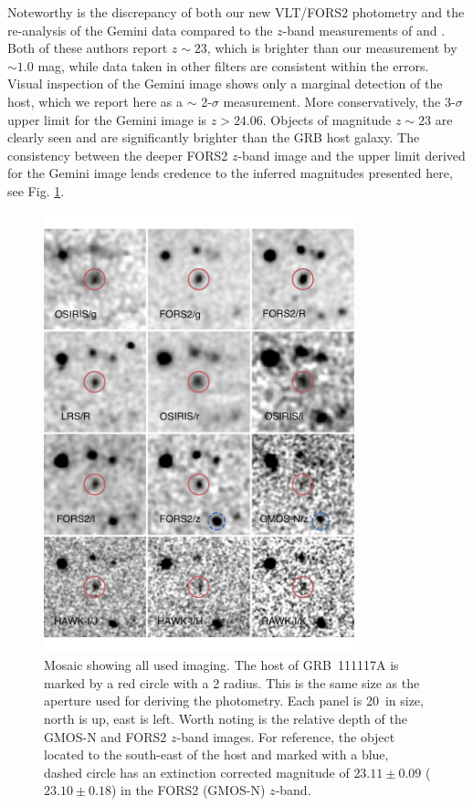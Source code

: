 \documentclass{aa}    %
\begin{document}
Noteworthy is the discrepancy of both our new VLT/FORS2 photometry and the
re-analysis of the Gemini data compared to the $z$-band measurements of
\citet{Margutti2012} and \citet{Sakamoto2013}. Both of these authors report $z
\sim 23$, which is brighter than our measurement by $\sim 1.0$ mag, while data
taken in other filters are consistent within the errors. Visual inspection of
the Gemini image shows only a marginal detection of the host, which we report
here as a $\sim$ 2-$\sigma$ measurement. More conservatively, the 3-$\sigma$
upper limit for the Gemini image is $z > 24.06$. Objects of magnitude $z \sim
23$ are clearly seen and are significantly brighter than the GRB host galaxy.
The consistency between the deeper FORS2 $z$-band image and the upper limit
derived for the Gemini image lends credence to the inferred magnitudes presented
here, see Fig. \ref{fig:photplot}.

\begin{figure}
	\centering \includegraphics[width=9cm]{figures/photometry_mosaic.pdf}
\caption{Mosaic showing all used imaging. The host of GRB~111117A is marked by
	a red circle with a 2 radius. This is the same size as the aperture used
	for deriving the photometry. Each panel is 20\arcsec~in size, north is up, east
	is left. Worth noting is the relative depth of the GMOS-N and FORS2 $z$-band
	images. For reference, the object located to the south-east of the host and
	marked with a blue, dashed circle has an extinction corrected magnitude of
	$23.11 \pm 0.09$ ($23.10 \pm 0.18$) in the FORS2 (GMOS-N) $z$-band.}
\label{fig:photplot}
\end{figure}
\end{document}
